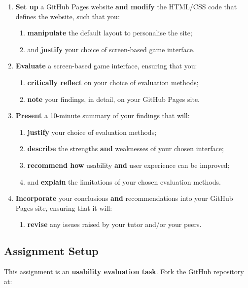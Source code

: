 \documentclass{../fal_assignment}
\begin{document}
\begin{enumerate}[label=(\alph*)]
    \item \textbf{Set up} a GitHub Pages website \textbf{and modify} the HTML/CSS code that defines the website, such that you: 
    	\begin{enumerate}[label=\roman*.]
    		\item \textbf{manipulate} the default layout to personalise the site;
    		\item and \textbf{justify} your choice of screen-based game interface.
	\end{enumerate}
    \item \textbf{Evaluate} a screen-based game interface, ensuring that you:
    	\begin{enumerate}[label=\roman*.]
    		\item \textbf{critically reflect} on your choice of evaluation methods;
		\item \textbf{note} your findings, in detail, on your GitHub Pages site.
	\end{enumerate}
    \item \textbf{Present} a 10-minute summary of your findings that will:
    	\begin{enumerate}[label=\roman*.]
    		\item \textbf{justify} your choice of evaluation methods;
    		\item \textbf{describe} the strengths \textbf{and} weaknesses of your chosen interface;
    		\item \textbf{recommend how} usability \textbf{and} user experience can be improved;
    		\item and \textbf{explain} the limitations of your chosen evaluation methods.
	\end{enumerate}
	\item \textbf{Incorporate} your conclusions \textbf{and} recommendations into your GitHub Pages site, ensuring that it will:
    	\begin{enumerate}[label=\roman*.]
    		\item \textbf{revise} any issues raised by your tutor and/or your peers.		
	\end{enumerate}
\end{enumerate}

\subsection*{Assignment Setup}

This assignment is an \textbf{usability evaluation task}. Fork the GitHub repository at:
\end{document}
